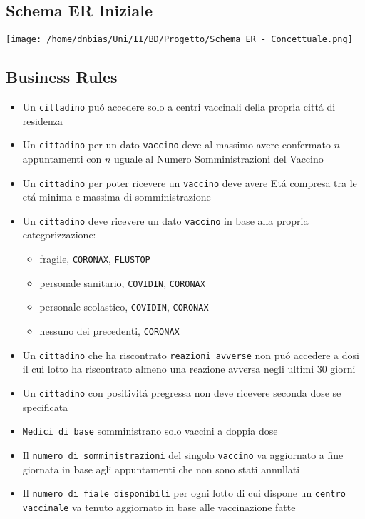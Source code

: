 \documentclass[11pt]{article}
\begin{document}
\subsection{Schema ER Iniziale}
\label{sec:orgd477f49}
\begin{center}
\texttt{[image: /home/dnbias/Uni/II/BD/Progetto/Schema ER - Concettuale.png]}
\end{center}
\subsection{Business Rules}
\label{sec:orgf818be1}
\begin{itemize}
\item Un \texttt{cittadino} puó accedere solo a centri vaccinali della propria cittá di residenza
\item Un \texttt{cittadino} per un dato \texttt{vaccino} deve al massimo avere confermato \(n\) appuntamenti con \(n\) uguale al Numero Somministrazioni del Vaccino
\item Un \texttt{cittadino} per poter ricevere un \texttt{vaccino} deve avere Etá compresa tra le etá minima e massima di somministrazione
\item Un \texttt{cittadino} deve ricevere un dato \texttt{vaccino} in base alla propria categorizzazione:
\begin{itemize}
\item fragile, \texttt{CORONAX}, \texttt{FLUSTOP}
\item personale sanitario, \texttt{COVIDIN}, \texttt{CORONAX}
\item personale scolastico, \texttt{COVIDIN}, \texttt{CORONAX}
\item nessuno dei precedenti, \texttt{CORONAX}
\end{itemize}
\item Un \texttt{cittadino} che ha riscontrato \texttt{reazioni avverse} non puó accedere a dosi il  cui lotto ha riscontrato almeno una reazione avversa negli ultimi 30 giorni
\item Un \texttt{cittadino} con positivitá pregressa non deve ricevere seconda dose se specificata
\item \texttt{Medici di base} somministrano solo vaccini a doppia dose
\item Il \texttt{numero di somministrazioni} del singolo \texttt{vaccino} va aggiornato a fine giornata in base agli appuntamenti che non sono stati annullati
\item Il \texttt{numero di fiale disponibili} per ogni lotto di cui dispone un \texttt{centro vaccinale} va tenuto aggiornato in base alle vaccinazione fatte
\end{itemize}
\end{document}
